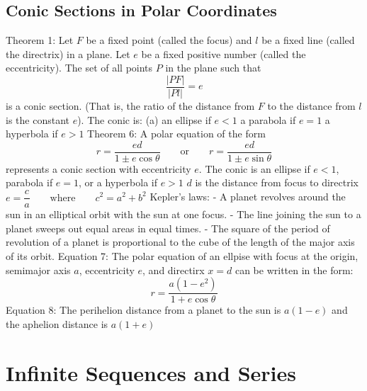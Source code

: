 \documentclass{article}
\begin{document}
    \subsection{Conic Sections in Polar Coordinates}
    \begin{outline}
        \1 Theorem 1: Let $F$ be a fixed point (called the focus) and $l$ be a fixed line (called the directrix) in a plane. Let $e$ be a fixed positive number (called the eccentricity). The set of all points $P$ in the plane such that \[\dfrac{|PF|}{|Pl|}=e\] is a conic section. (That is, the ratio of the distance from $F$ to the distance from $l$ is the constant $e$). The conic is: 
            \2 (a) an ellipse if \(e<1\)
            \2 a parabola if \(e=1\)
            \2 a hyperbola if \(e>1\)
        \1 Theorem 6: A polar equation of the form \[r=\dfrac{ed}{1\pm e\cos\theta}\qquad\text{or}\qquad r=\dfrac{ed}{1\pm e\sin\theta}\] represents a conic section with eccentricity $e$. The conic is an ellipse if \(e<1\), parabola if \(e=1\), or a hyperbola if \(e>1\)
            \2 $d$ is the distance from focus to directrix
        \1 \(e=\dfrac{c}{a}\qquad\text{where}\qquad c^2=a^2+b^2\)
        \1 Kepler's laws: 
             - A planet revolves around the sun in an elliptical orbit with the sun at one focus. 
             - The line joining the sun to a planet sweeps out equal areas in equal times. 
             - The square of the period of revolution of a planet is proportional to the cube of the length of the major axis of its orbit. 
        \1 Equation 7: The polar equation of an ellpise with focus at the origin, semimajor axis $a$, eccentricity $e$, and directirx \(x=d\) can be written in the form: \[r=\dfrac{a(1-e^2)}{1+e\cos\theta}\]
        \1 Equation 8: The perihelion distance from a planet to the sun is \(a(1-e)\) and the aphelion distance is \(a(1+e)\)
    \end{outline}
    
    \section{Infinite Sequences and Series} %
    
\end{document}
